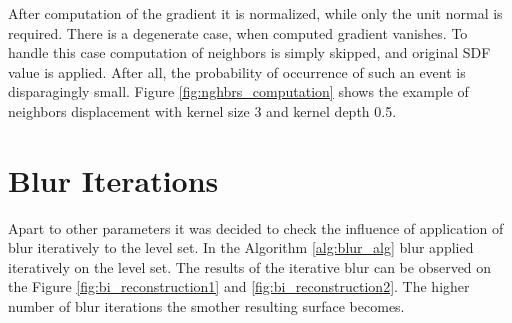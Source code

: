 After computation of the gradient it is normalized, while only the unit normal is required. There is a degenerate case, when computed gradient vanishes. To handle this case computation of neighbors is simply skipped, and original SDF value is applied. After all, the probability of occurrence of such an event is disparagingly small. Figure \ref{fig:nghbrs_computation} shows the example of neighbors displacement with kernel size 3 and kernel depth 0.5.

\section{Blur Iterations}
Apart to other parameters it was decided to check the influence of application of blur iteratively to the level set. In the Algorithm \ref{alg:blur_alg} blur applied iteratively on the level set. The results of the iterative blur can be observed on the Figure \ref{fig:bi_reconstruction1} and \ref{fig:bi_reconstruction2}. The higher number of blur iterations the smother resulting surface becomes. 
